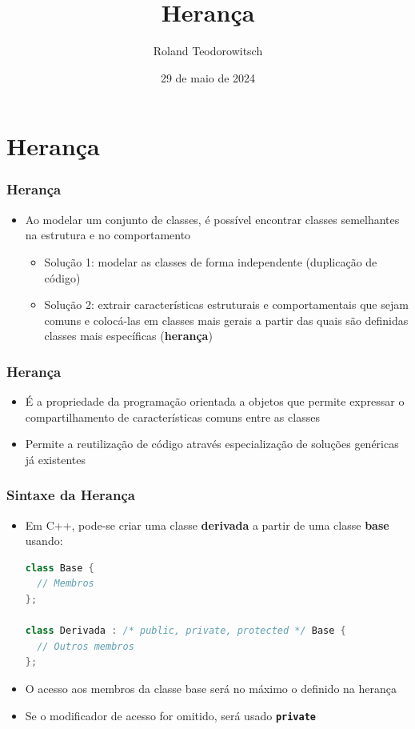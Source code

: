 \documentclass[aspectratio=169]{beamer}
\title[\sc{Herança}]{Herança}
\author[Roland Teodorowitsch]{Roland Teodorowitsch}
\institute[POO - EC - PUCRS]{Programação Orientada a Objetos - ECo - Curso de Engenharia de Computação - PUCRS}
\date{29 de maio de 2024}
\begin{document}
\justifying

\begin{frame}
	\titlepage
\end{frame}

\section{Herança}

\begin{frame}\frametitle{Herança}
\begin{itemize}
	\item Ao modelar um conjunto de classes, é possível encontrar classes semelhantes na estrutura e no comportamento
	\begin{itemize}
		\item Solução 1: modelar as classes de forma independente (duplicação de código)
		\item Solução 2: extrair características estruturais e comportamentais que sejam comuns e colocá-las em classes mais gerais a partir das quais são definidas classes mais específicas (\textbf{herança})
	\end{itemize}
\end{itemize}
\end{frame}

\begin{frame}\frametitle{Herança}
\begin{itemize}
	\item É a propriedade da programação orientada a objetos que permite expressar o compartilhamento de características comuns entre as classes
	\item Permite a reutilização de código através especialização de soluções genéricas já existentes
\end{itemize}
\end{frame}

\begin{frame}[fragile]\frametitle{Sintaxe da Herança}
\begin{itemize}
	\item Em C++, pode-se criar uma classe \textbf{derivada} a partir de uma classe \textbf{base} usando:
\begin{lstlisting}[language=C++,basicstyle=\ttfamily\scriptsize]
class Base {
  // Membros
};

class Derivada : /* public, private, protected */ Base {
  // Outros membros
};
\end{lstlisting}
	\item O acesso aos membros da classe base será no máximo o definido na herança
	\item Se o modificador de acesso for omitido, será usado \textbf{\texttt{private}}
\end{itemize}
\end{frame}
\end{document}
